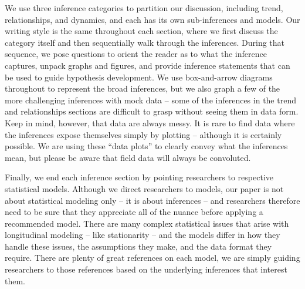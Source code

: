 \documentclass[english,,man]{apa6}
\theoremstyle{definition}
\theoremstyle{definition}
\theoremstyle{definition}
\theoremstyle{remark}
\begin{document}
We use three inference categories to partition our discussion, including
trend, relationships, and dynamics, and each has its own sub-inferences
and models. Our writing style is the same throughout each section, where
we first discuss the category itself and then sequentially walk through
the inferences. During that sequence, we pose questions to orient the
reader as to what the inference captures, unpack graphs and figures, and
provide inference statements that can be used to guide hypothesis
development. We use box-and-arrow diagrams throughout to represent the
broad inferences, but we also graph a few of the more challenging
inferences with mock data -- some of the inferences in the trend and
relationships sections are difficult to grasp without seeing them in
data form. Keep in mind, however, that data are always messy. It is rare
to find data where the inferences expose themselves simply by plotting
-- although it is certainly possible. We are using these \enquote{data
plots} to clearly convey what the inferences mean, but please be aware
that field data will always be convoluted.

Finally, we end each inference section by pointing researchers to
respective statistical models. Although we direct researchers to models,
our paper is not about statistical modeling only -- it is about
inferences -- and researchers therefore need to be sure that they
appreciate all of the nuance before applying a recommended model. There
are many complex statistical issues that arise with longitudinal
modeling -- like stationarity -- and the models differ in how they
handle these issues, the assumptions they make, and the data format they
require. There are plenty of great references on each model, we are
simply guiding researchers to those references based on the underlying
inferences that interest them.
\end{document}
